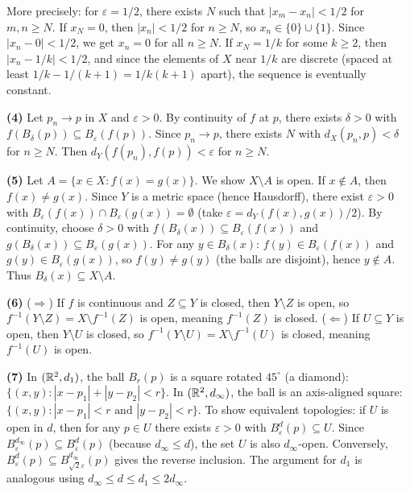 \documentclass{report}
\begin{document}
\begin{solution}
More precisely: for \(\varepsilon = 1/2\), there exists \(N\) such that \(|x_m - x_n| < 1/2\) for \(m, n \geq N\). If \(x_N = 0\), then \(|x_n| < 1/2\) for \(n \geq N\), so \(x_n \in \{0\} \cup \{1\}\). Since \(|x_n - 0| < 1/2\), we get \(x_n = 0\) for all \(n \geq N\). If \(x_N = 1/k\) for some \(k \geq 2\), then \(|x_n - 1/k| < 1/2\), and since the elements of \(X\) near \(1/k\) are discrete (spaced at least \(1/k - 1/(k+1) = 1/k(k+1)\) apart), the sequence is eventually constant.

\textbf{(4)} Let \(p_n \to p\) in \(X\) and \(\varepsilon > 0\). By continuity of \(f\) at \(p\), there exists \(\delta > 0\) with \(f(B_\delta(p)) \subseteq B_\varepsilon(f(p))\). Since \(p_n \to p\), there exists \(N\) with \(d_X(p_n, p) < \delta\) for \(n \geq N\). Then \(d_Y(f(p_n), f(p)) < \varepsilon\) for \(n \geq N\).

\textbf{(5)} Let \(A = \{x \in X : f(x) = g(x)\}\). We show \(X \setminus A\) is open. If \(x \notin A\), then \(f(x) \neq g(x)\). Since \(Y\) is a metric space (hence Hausdorff), there exist \(\varepsilon > 0\) with \(B_\varepsilon(f(x)) \cap B_\varepsilon(g(x)) = \emptyset\) (take \(\varepsilon = d_Y(f(x), g(x))/2\)). By continuity, choose \(\delta > 0\) with \(f(B_\delta(x)) \subseteq B_\varepsilon(f(x))\) and \(g(B_\delta(x)) \subseteq B_\varepsilon(g(x))\). For any \(y \in B_\delta(x)\): \(f(y) \in B_\varepsilon(f(x))\) and \(g(y) \in B_\varepsilon(g(x))\), so \(f(y) \neq g(y)\) (the balls are disjoint), hence \(y \notin A\). Thus \(B_\delta(x) \subseteq X \setminus A\).

\textbf{(6)} (\(\Rightarrow\)) If \(f\) is continuous and \(Z \subseteq Y\) is closed, then \(Y \setminus Z\) is open, so \(f^{-1}(Y \setminus Z) = X \setminus f^{-1}(Z)\) is open, meaning \(f^{-1}(Z)\) is closed. (\(\Leftarrow\)) If \(U \subseteq Y\) is open, then \(Y \setminus U\) is closed, so \(f^{-1}(Y \setminus U) = X \setminus f^{-1}(U)\) is closed, meaning \(f^{-1}(U)\) is open.

\textbf{(7)} In \((\RR[2], d_1)\), the ball \(B_r(p)\) is a square rotated \(45^\circ\) (a diamond): \(\{(x,y) : |x - p_1| + |y - p_2| < r\}\). In \((\RR[2], d_\infty)\), the ball is an axis-aligned square: \(\{(x,y) : |x - p_1| < r \text{ and } |y - p_2| < r\}\). To show equivalent topologies: if \(U\) is open in \(d\), then for any \(p \in U\) there exists \(\varepsilon > 0\) with \(B_\varepsilon^d(p) \subseteq U\). Since \(B_\varepsilon^{d_\infty}(p) \subseteq B_\varepsilon^d(p)\) (because \(d_\infty \leq d\)), the set \(U\) is also \(d_\infty\)-open. Conversely, \(B_\varepsilon^d(p) \subseteq B_{\sqrt{2}\varepsilon}^{d_\infty}(p)\) gives the reverse inclusion. The argument for \(d_1\) is analogous using \(d_\infty \leq d \leq d_1 \leq 2 d_\infty\).


\end{solution}
\end{document}
